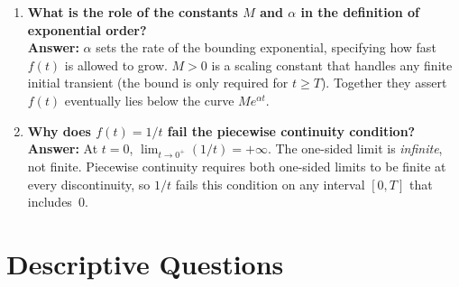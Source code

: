 \documentclass[12pt,a4paper]{article}
\begin{document}
\begin{enumerate}[label=\textbf{Q\arabic*.}]
\item \textbf{What is the role of the constants $M$ and $\alpha$ in the definition of exponential order?} \\
\textbf{Answer:} $\alpha$ sets the rate of the bounding exponential, specifying how fast $f(t)$
is allowed to grow. $M > 0$ is a scaling constant that handles any finite initial transient
(the bound is only required for $t \geq T$). Together they assert $f(t)$ eventually lies below
the curve $M e^{\alpha t}$.

\item \textbf{Why does $f(t) = 1/t$ fail the piecewise continuity condition?} \\
\textbf{Answer:} At $t = 0$, $\lim_{t \to 0^+} (1/t) = +\infty$. The one-sided limit is
\emph{infinite}, not finite. Piecewise continuity requires both one-sided limits to be finite at
every discontinuity, so $1/t$ fails this condition on any interval $[0, T]$ that includes~$0$.

\end{enumerate}

\section{Descriptive Questions}
\end{document}
